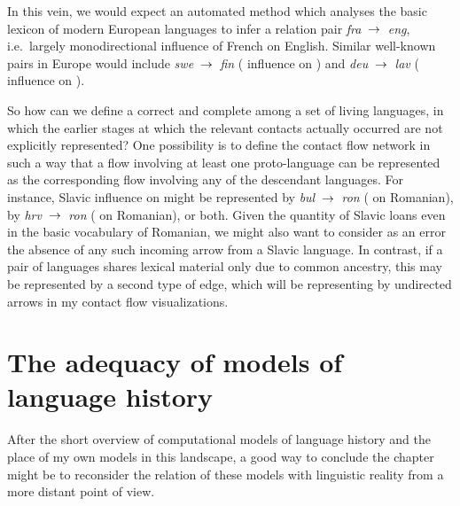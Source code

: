 In this vein, we would expect an automated method which analyses the basic lexicon of modern European languages to infer a relation pair \textit{fra} $\kern 2pt\hbox{$\rightarrow$}\kern 2pt$ \textit{eng}, i.e.\ largely monodirectional influence of French on English. Similar well-known pairs in Europe would include \textit{swe} $\kern 2pt\hbox{$\rightarrow$}\kern 2pt$ \textit{fin} ( influence on ) and \textit{deu} $\kern 2pt\hbox{$\rightarrow$}\kern 2pt$ \textit{lav} ( influence on ).

So how can we define a correct and complete  among a set of living languages, in which the earlier stages at which the relevant contacts actually occurred are not explicitly represented? One possibility is to define the contact flow network in such a way that a flow involving at least one proto-language can be represented as the corresponding flow involving any of the descendant languages. For instance, Slavic influence on  might be represented by \textit{bul} $\kern 2pt\hbox{$\rightarrow$}\kern 2pt$ \textit{ron} ( on Romanian), by \textit{hrv} $\kern 2pt\hbox{$\rightarrow$}\kern 2pt$ \textit{ron} ( on Romanian), or both. Given the quantity of Slavic loans even in the basic vocabulary of Romanian, we might also want to consider as an error the absence of any such incoming arrow from a Slavic language. In contrast, if a pair of languages shares lexical material only due to common ancestry, this may be represented by a second type of edge, which will be representing by 
undirected arrows in my contact flow visualizations.

\section{The adequacy of models of language history}
After the short overview of computational models of language history and the place of my own models in this landscape, a good way to conclude the chapter might be to reconsider the relation of these models with linguistic reality from a more distant point of view. 

